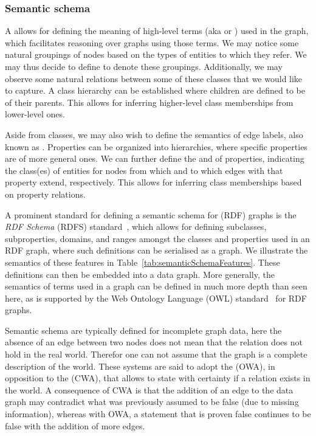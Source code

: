 \subsubsection{Semantic schema}
A  allows for defining the meaning of high-level terms (aka  or ) used in the graph, which facilitates reasoning over graphs using those terms. We may notice some natural groupings of nodes based on the types of entities to which they refer. We may thus decide to define  to denote these groupings. Additionally, we may observe some natural relations between some of these classes that we would like to capture. A class hierarchy can be established where children are defined to be  of their parents. This allows for inferring higher-level class memberships from lower-level ones.

Aside from classes, we may also wish to define the semantics of edge labels, also known as . Properties can be organized into hierarchies, where specific properties are  of more general ones. We can further define the  and  of properties, indicating the class(es) of entities for nodes from which and to which edges with that property extend, respectively. This allows for inferring class memberships based on property relations.

A prominent standard for defining a semantic schema for (RDF) graphs is the \textit{RDF Schema} (RDFS) standard~\cite{Brickley2014RDFSchema1.1}, which allows for defining subclasses, subproperties, domains, and ranges amongst the classes and properties used in an RDF graph, where such definitions can be serialised as a graph. We illustrate the semantics of these features in Table~\ref{tab:semanticSchemaFeatures}. These definitions can then be embedded into a data graph. More generally, the semantics of terms used in a graph can be defined in much more depth than seen here, as is supported by the Web Ontology Language (OWL) standard~\cite{Hitzler2014OWLPrimer} for RDF graphs.

Semantic schema are typically defined for incomplete graph data, here the absence of an edge between two nodes does not mean that the relation does not hold in the real world. Therefor one can not assume that the graph is a complete description of the world. These systems are said to adopt the  (OWA), in opposition to the  (CWA), that allows to state with certainty if a relation exists in the world. A consequence of CWA is that the addition of an edge to the data graph may contradict what was previously assumed to be false (due to missing information), whereas with OWA, a statement that is proven false continues to be false with the addition of more edges.

